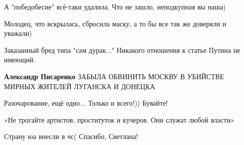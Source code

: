 \begin{itemize}
А "победобесие" всё-таки удалила. Что не зашло, неподкупная вы наша)

 
Молодец, что вскрылась, сбросила маску, а то бы все так же доверяли и уважали)

 
Заказанный бред типа "сам дурак..." Никакого отношения к статье Путина не имеющий.

\begin{itemize}
 
\textbf{Александр Писаренко} ЗАБЫЛА ОБВИНИТЬ МОСКВУ В УБИЙСТВЕ МИРНЫХ ЖИТЕЛЕЙ ЛУГАНСКА И ДОНЕЦКА
\end{itemize}

 
Разочарование, ещё одно... Только и всего!)) Бувайте!

 
«Не трогайте артистов, проституток и кучеров. Они служат любой власти»

 
Страну юа внесли в чс( Спасибо, Светлана!

 

\end{itemize}
